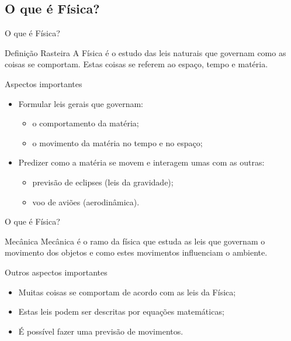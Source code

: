 \documentclass[xcolor=dvipsnames,table]{beamer}
\begin{document}
	\subsection{O que é Física?}
	\begin{frame}{O que é Física?}
		\begin{block}{Definição Rasteira}
			A Física é o estudo das leis naturais que governam como as coisas se comportam. Estas coisas se referem ao espaço, tempo e matéria.
		\end{block} \pause
		\begin{block}{Aspectos importantes}
			\begin{itemize}
				\item Formular leis gerais que governam: \pause
					\begin{itemize} 
						\item o comportamento da matéria;
						\item o movimento da matéria no tempo e no espaço;
					\end{itemize} \pause
				\item Predizer como a matéria se movem e interagem umas com as outras: \pause
					\begin{itemize}
						\item previsão de eclipses (leis da gravidade);
						\item voo de aviões (aerodinâmica).
					\end{itemize}
			\end{itemize}
		\end{block}	
	\end{frame}
	
	\begin{frame}{O que é Física?}
		\begin{block}{Mecânica}
			 Mecânica é o ramo da física que estuda as leis que governam o movimento dos objetos e como estes movimentos influenciam o ambiente.
		\end{block} \pause
		\begin{block}{Outros aspectos importantes}
			\begin{itemize}
				\item Muitas coisas se comportam de acordo com as leis da Física; \pause
				\item Estas leis podem ser descritas por equações matemáticas; \pause
				\item É possível fazer uma previsão de movimentos.
			\end{itemize}
		\end{block}	
	\end{frame}
	
\end{document}
